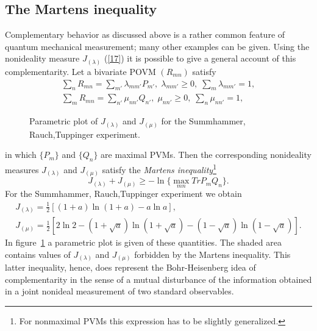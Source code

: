 \documentclass{ws-procs975x65}
\begin{document}
{\subsection{The Martens inequality}\label{sec2.2}
Complementary behavior as discussed above is a rather common
feature of quantum mechanical measurement; many other examples can
be given\cite{dM2002}. Using the nonideality measure
$J_{(\lambda)}$ (\ref{17}) it is possible to give a general
account of this complementarity\cite{MadM90}. Let a bivariate POVM
$(R_{mn})$ satisfy \begin{equation}\label{2.2.1}
\begin{array}{l}
\sum_n R_{mn} = \sum_{m'} \lambda_{mm'} P_{m'},\; \lambda_{mm'}
\geq 0,\; \sum_m \lambda_{mm'} = 1,\\
\sum_m R_{mn} = \sum_{n'} \mu_{nn'} Q_{n'},\; \mu_{nn'} \geq 0,\;
\sum_n \mu_{nn'} = 1,
\end{array}
 \end{equation}
\begin{figure}
 \caption{Parametric plot of $J_{(\lambda)}$
and $J_{(\mu)}$ for the Summhammer, Rauch,Tuppinger experiment.}
 \label{fig4}
\end{figure}
 in which $\{P_m\}$ and $\{Q_n\}$ are maximal PVMs.
Then the corresponding nonideality measures $J_{(\lambda)}$ and
$J_{(\mu)}$ satisfy the \textit{Martens inequality}\footnote{For
nonmaximal PVMs this expression has to be slightly
generalized\cite{MadM90}.}
\[ J_{(\lambda)} +
J_{(\mu)} \geq -\ln \{\max_{mn} Tr P_m Q_n\}.\]
 For the Summhammer, Rauch,Tuppinger experiment
we obtain
\[\begin{array}{l}
J_{(\lambda)}=\frac{1}{2}[(1+a)\ln(1+a)-a\ln a],\\
J_{(\mu)}=\frac{1}{2}[2\ln2-(1+\sqrt{a})\ln(1+\sqrt{a})-
(1-\sqrt{a})\ln(1-\sqrt{a})].
\end{array}\]
In figure~\ref{fig4} a parametric plot is given of these
quantities. The shaded area contains values of $J_{(\lambda)}$ and
$J_{(\mu)}$ forbidden by the Martens inequality. This latter
inequality, hence, does represent the Bohr-Heisenberg idea of
complementarity in the sense of a mutual disturbance of the
information obtained in a joint nonideal measurement of two
standard observables.

}
\end{document}
